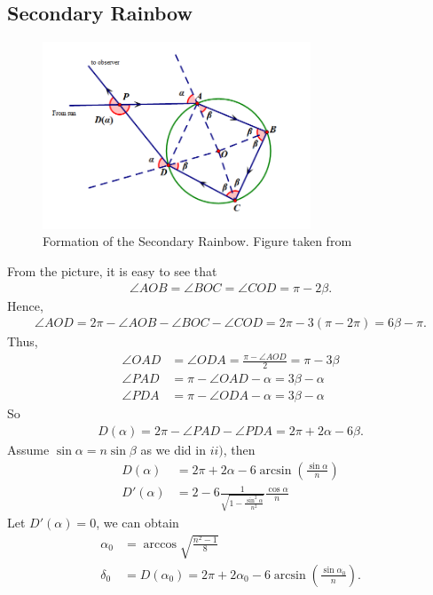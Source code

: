 \documentclass{article}
\begin{document}
\begin{spacing}{1.5}
\subsection{Secondary Rainbow}
\begin{figure}[!htb]
\centering
\includegraphics[width=8cm]{2_4.png}
\caption{Formation of the Secondary Rainbow. Figure taken from \cite{Calculus}}
\end{figure}
From the picture, it is easy to see that \begin{align*}\angle AOB =\angle BOC = \angle COD = \pi -2\beta.\end{align*}
Hence, \begin{align*}
\angle AOD = 2\pi -\angle AOB -\angle BOC -\angle COD = 2\pi -3(\pi -2\pi)=6\beta - \pi.
\end{align*}
Thus,
\begin{align*}
\angle OAD &= \angle ODA = \frac{\pi - \angle AOD}{2} = \pi - 3\beta\\
\angle PAD &= \pi - \angle OAD -\alpha = 3\beta -\alpha\\
\angle PDA &= \pi - \angle ODA - \alpha = 3\beta -\alpha
\end{align*}
So \begin{align*}D(\alpha)=2\pi - \angle PAD - \angle PDA = 2\pi  + 2\alpha - 6\beta.\end{align*}
Assume $\sin \alpha = n \sin \beta$ as we did in $ii)$, then \begin{align*}
D(\alpha)&= 2\pi  + 2\alpha - 6\arcsin(\frac{\sin \alpha }{n})\\
D'(\alpha)&= 2- 6\frac{1}{\sqrt{1-\frac{\sin^2\alpha}{n^2}}}\frac{\cos \alpha}{n}
\end{align*}
Let $D'(\alpha)=0$, we can obtain \begin{align*}\alpha_0&= \arccos \sqrt{\frac{n^2-1}{8}}\\ \delta_0 &= D(\alpha_0)=2\pi + 2\alpha_0 - 6 \arcsin(\frac{\sin \alpha_0}{n}).\end{align*}

\end{spacing}
\end{document}
